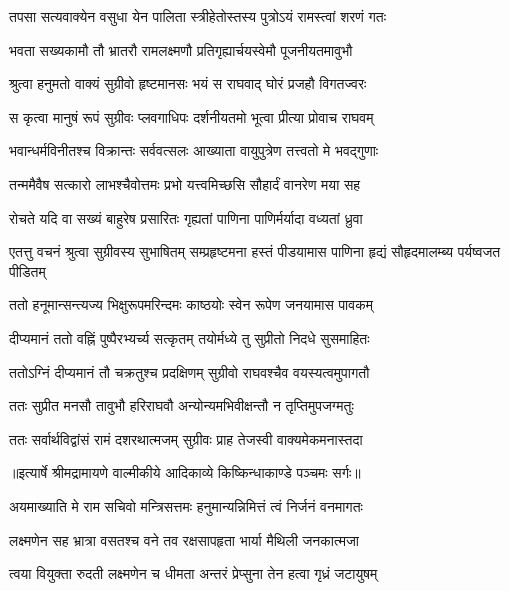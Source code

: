 \twolineshloka
{तपसा सत्यवाक्येन वसुधा येन पालिता}
{स्त्रीहेतोस्तस्य पुत्रोऽयं रामस्त्वां शरणं गतः} %

\twolineshloka
{भवता सख्यकामौ तौ भ्रातरौ रामलक्ष्मणौ}
{प्रतिगृह्यार्चयस्वेमौ पूजनीयतमावुभौ} %

\twolineshloka
{श्रुत्वा हनुमतो वाक्यं सुग्रीवो हृष्टमानसः}
{भयं स राघवाद् घोरं प्रजहौ विगतज्वरः} %

\twolineshloka
{स कृत्वा मानुषं रूपं सुग्रीवः प्लवगाधिपः}
{दर्शनीयतमो भूत्वा प्रीत्या प्रोवाच राघवम्} %

\twolineshloka
{भवान्धर्मविनीतश्च विक्रान्तः सर्ववत्सलः}
{आख्याता वायुपुत्रेण तत्त्वतो मे भवद्गुणाः} %

\twolineshloka
{तन्ममैवैष सत्कारो लाभश्चैवोत्तमः प्रभो}
{यत्त्वमिच्छसि सौहार्दं वानरेण मया सह} %

\twolineshloka
{रोचते यदि वा सख्यं बाहुरेष प्रसारितः}
{गृह्यतां पाणिना पाणिर्मर्यादा वध्यतां ध्रुवा} %

\threelineshloka
{एतत्तु वचनं श्रुत्वा सुग्रीवस्य सुभाषितम्}
{सम्प्रहृष्टमना हस्तं पीडयामास पाणिना}
{हृद्यं सौहृदमालम्ब्य पर्यष्वजत पीडितम्} %

\twolineshloka
{ततो हनूमान्सन्त्यज्य भिक्षुरूपमरिन्दमः}
{काष्ठयोः स्वेन रूपेण जनयामास पावकम्} %

\twolineshloka
{दीप्यमानं ततो वह्निं पुष्पैरभ्यर्च्य सत्कृतम्}
{तयोर्मध्ये तु सुप्रीतो निदधे सुसमाहितः} %

\twolineshloka
{ततोऽग्निं दीप्यमानं तौ चक्रतुश्च प्रदक्षिणम्}
{सुग्रीवो राघवश्चैव वयस्यत्वमुपागतौ} %

\twolineshloka
{ततः सुप्रीत मनसौ तावुभौ हरिराघवौ}
{अन्योन्यमभिवीक्षन्तौ न तृप्तिमुपजग्मतुः} %

\twolineshloka
{ततः सर्वार्थविद्वांसं रामं दशरथात्मजम्}
{सुग्रीवः प्राह तेजस्वी वाक्यमेकमनास्तदा} %


{॥इत्यार्षे श्रीमद्रामायणे वाल्मीकीये आदिकाव्ये किष्किन्धाकाण्डे पञ्चमः सर्गः॥}


\twolineshloka
{अयमाख्याति मे राम सचिवो मन्त्रिसत्तमः}
{हनुमान्यन्निमित्तं त्वं निर्जनं वनमागतः} %

\twolineshloka
{लक्ष्मणेन सह भ्रात्रा वसतश्च वने तव}
{रक्षसापहृता भार्या मैथिली जनकात्मजा} %

\twolineshloka
{त्वया वियुक्ता रुदती लक्ष्मणेन च धीमता}
{अन्तरं प्रेप्सुना तेन हत्वा गृध्रं जटायुषम्} %

